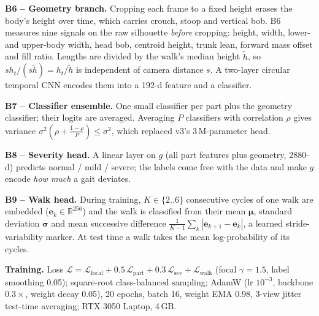 \documentclass[conference]{IEEEtran}
\newcommand{\R}{\mathbb{R}}
\begin{document}
\textbf{B6 -- Geometry branch.} Cropping each frame to a fixed height erases the
body's height over time, which carries crouch, stoop and vertical bob. B6
measures nine signals on the raw silhouette \emph{before} cropping: height,
width, lower- and upper-body width, head bob, centroid height, trunk lean,
forward mass offset and fill ratio. Lengths are divided by the walk's median
height $\tilde h$, so $s h_t/(s\tilde h)=h_t/\tilde h$ is independent of camera
distance $s$. A two-layer circular temporal CNN encodes them into a 192-d
feature and a classifier.

\textbf{B7 -- Classifier ensemble.} One small classifier per part plus the
geometry classifier; their logits are averaged. Averaging $P$ classifiers with
correlation $\rho$ gives variance $\sigma^2(\rho+\frac{1-\rho}{P})\le\sigma^2$,
which replaced v3's 3\,M-parameter head.

\textbf{B8 -- Severity head.} A linear layer on $g$ (all part features plus
geometry, 2880-d) predicts normal / mild / severe; the labels come free with
the data and make $g$ encode \emph{how much} a gait deviates.

\textbf{B9 -- Walk head.} During training, $K\in\{2..6\}$ consecutive cycles
of one walk are embedded ($\mathbf e_k\in\R^{256}$) and the walk is classified
from their mean $\boldsymbol\mu$, standard deviation $\boldsymbol\sigma$ and
mean successive difference $\frac1{K-1}\sum_k|\mathbf e_{k+1}-\mathbf e_k|$, a
learned stride-variability marker. At test time a walk takes the mean
log-probability of its cycles.

\textbf{Training.} Loss $\mathcal{L}=\mathcal{L}_{\text{focal}}+0.5\,
\mathcal{L}_{\text{part}}+0.3\,\mathcal{L}_{\text{sev}}+\mathcal{L}_{\text{walk}}$
(focal $\gamma=1.5$, label smoothing 0.05); square-root class-balanced
sampling; AdamW (lr $10^{-3}$, backbone $0.3\times$, weight decay 0.05), 20
epochs, batch 16, weight EMA 0.98, 3-view jitter test-time averaging; RTX 3050
Laptop, 4\,GB.

\end{document}
